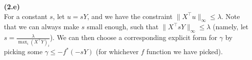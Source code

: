 \textbf{(2.e)}\\
For a constant $s$,  let $u=sY$, and we have the constraint $\|X^\top u\|_\infty \leq \lambda$. 
Note that we can always make $s$ small enough, such that $\|X^\top s Y\|_\infty \leq \lambda$
(namely, let $s = \frac{\lambda}{\max_i (X^\top Y)_i}$). 
We can then choose a corresponding explicit form for $\gamma$ by picking some
$\gamma \leq -f^*(-sY)$ (for whichever $f$ function we have picked).



